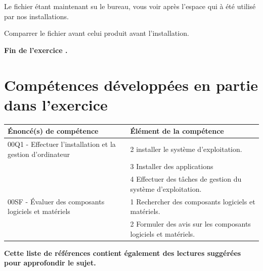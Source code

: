 Le fichier étant maintenant su le bureau, vous voir après l'espace qui à été utilisé par nos installations.

Comparrer le fichier avant celui produit avant l'installation.
	
	\vspace{2cm}
	\textbf{ Fin de l'exercice \exercice.}
	
	
	
	
	
	
	
	\section{Compétences développées en partie dans l'exercice \exercice}
	\begin{tabular}{|p{5cm}|l|}
		\hline
		\textbf{Énoncé(s) de compétence}&\textbf{Élément de la compétence} \\[3pt]
		\hline
		00Q1 - Effectuer l’installation et la gestion d’ordinateur&2 installer le système d’exploitation.\\
		&3 Installer des applications\\
		&4 Effectuer des tâches de gestion du système d’exploitation.\\
		\hline
		00SF - Évaluer des composants logiciels et
		matériels&1 Rechercher des composants logiciels et matériels.\\
		&2 Formuler des avis sur les composants logiciels et matériels.\\
		\hline
		
	\end{tabular}
	
	
	\printindex
	
	
	
	\renewcommand{\contentsname}{Sommaire} %
	
	\setcounter{tocdepth}{5}
	
	
	\tableofcontents
	
	\pagebreak
	
	
	
	\nocite{*}
	
	
	
	\textbf{Cette liste de références contient également des lectures suggérées pour approfondir le sujet.}\\
	\printbibliography
	
